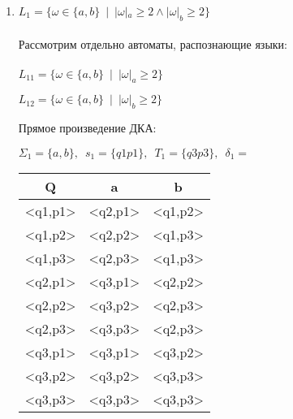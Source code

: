 \documentclass[a4paper, 12pt] {article} %
\begin{document}
\begin{enumerate}
    \item 
    $L_1 = \{\omega \in \{a,b\} \enspace | \enspace |\omega|_a \ge 2 \wedge |\omega|_b \ge 2\}$
    \\ \\
    Рассмотрим отдельно автоматы, распознающие языки:
    \\ \\
    $L_{11} = \{\omega \in \{a,b\} \enspace | \enspace |\omega|_a \ge 2\}$
    \begin{center}
    \end{center}
        
    $L_{12} = \{\omega \in \{a,b\} \enspace | \enspace |\omega|_b \ge 2\}$
    \begin{center}
    \end{center}
    
    Прямое произведение ДКА:
    
    $\Sigma_1 = \{a,b\}, \enspace s_1 = \{q1p1\}, \enspace T_1 = \{q3p3\}, \enspace \delta_1 =$
    \begin{center}
        \begin{tabular}{|c|c|c|}
            \hline
            Q       & a       & b       \\ \hline
            <q1,p1> & <q2,p1> & <q1,p2> \\ \hline
            <q1,p2> & <q2,p2> & <q1,p3> \\ \hline
            <q1,p3> & <q2,p3> & <q1,p3> \\ \hline
            <q2,p1> & <q3,p1> & <q2,p2> \\ \hline
            <q2,p2> & <q3,p2> & <q2,p3> \\ \hline
            <q2,p3> & <q3,p3> & <q2,p3>  \\ \hline
            <q3,p1> & <q3,p1> & <q3,p2> \\ \hline
            <q3,p2> & <q3,p2> & <q3,p3> \\ \hline
            <q3,p3> & <q3,p3> & <q3,p3> \\ \hline
        \end{tabular}
    \end{center}


\end{enumerate}
\end{document}

